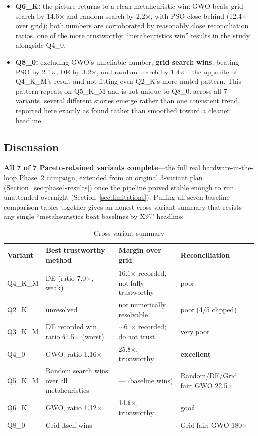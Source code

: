 \documentclass[journal]{IEEEtran}
\begin{document}
\begin{itemize}
  \item \textbf{Q6\_K:} the picture returns to a clean metaheuristic win: GWO beats grid search by 14.6$\times$ and random search by 2.2$\times$, with PSO close behind (12.4$\times$ over grid); both numbers are corroborated by reasonably close reconciliation ratios, one of the more trustworthy ``metaheuristics win'' results in the study alongside Q4\_0.
  \item \textbf{Q8\_0:} excluding GWO's unreliable number, \textbf{grid search wins}, beating PSO by 2.1$\times$, DE by 3.2$\times$, and random search by 1.4$\times$---the opposite of Q4\_K\_M's result and not fitting even Q2\_K's more muted pattern. This pattern repeats on Q5\_K\_M and is not unique to Q8\_0: across all 7 variants, several different stories emerge rather than one consistent trend, reported here exactly as found rather than smoothed toward a cleaner headline.
\end{itemize}

\subsection{Discussion}
\label{sec:discussion}

\textbf{All 7 of 7 Pareto-retained variants complete}---the full real hardware-in-the-loop Phase~2 campaign, extended from an original 3-variant plan (Section~\ref{sec:phase1-results}) once the pipeline proved stable enough to run unattended overnight (Section~\ref{sec:limitations}). Pulling all seven baseline-comparison tables together gives an honest cross-variant summary that resists any single ``metaheuristics beat baselines by X\%'' headline:

\begin{table}[t]
\caption{Cross-variant summary}
\label{tab:cross-variant-summary}
\centering
\footnotesize
\begin{tabular}{@{}lp{2.3cm}p{1.9cm}p{1.6cm}@{}}
\toprule
Variant & Best trustworthy method & Margin over grid & Reconciliation \\
\midrule
Q4\_K\_M & DE (ratio 7.0$\times$, weak) & 16.1$\times$ recorded, not fully trustworthy & poor \\
Q2\_K & unresolved & not numerically resolvable & poor (4/5 clipped) \\
Q3\_K\_M & DE recorded win, ratio 61.5$\times$ (worst) & $\sim$61$\times$ recorded; do not trust & very poor \\
Q4\_0 & GWO, ratio 1.16$\times$ & 25.8$\times$, trustworthy & \textbf{excellent} \\
Q5\_K\_M & Random search wins over all metaheuristics & --- (baseline wins) & Random/DE/Grid fair; GWO 22.5$\times$ \\
Q6\_K & GWO, ratio 1.12$\times$ & 14.6$\times$, trustworthy & good \\
Q8\_0 & Grid itself wins & --- & Grid fair; GWO 180$\times$ \\
\bottomrule
\end{tabular}
\end{table}
\end{document}

